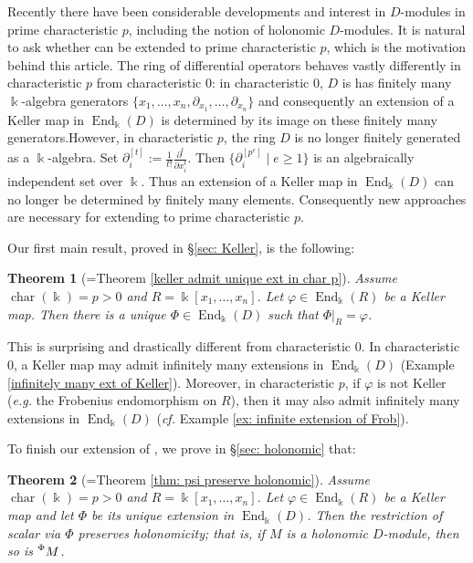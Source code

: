 \documentclass[11pt]{amsart}
\newtheorem{theorem}{Theorem}[section]
\theoremstyle{definition}
\theoremstyle{remark}
\numberwithin{equation}{subsection}
\DeclareMathOperator{\kk}{\Bbbk}
\DeclareMathOperator{\ch}{char}
\DeclareMathOperator{\End}{End}
\begin{document}
Recently there have been considerable developments and interest in $D$-modules in prime characteristic $p$, including the notion of holonomic $D$-modules. It is natural to ask whether \cite[Theorem 1.3]{BavulaAnnals} can be extended to prime characteristic $p$, which is the motivation behind this article. The ring of differential operators behaves vastly differently in characteristic $p$ from characteristic 0: in characteristic 0, $D$ is has finitely many $\kk$-algebra generators $\{x_1,\dots,x_n,\partial_{x_1},\dots,\partial_{x_n}\}$ and consequently an extension of a Keller map in $\End_{\kk}(D)$ is determined by its image on these finitely many generators.However, in characteristic $p$, the ring $D$ is no longer finitely generated as a $\kk$-algebra. Set $\partial_i^{[t]}:=\frac{1}{t!}\frac{\partial^{t}}{\partial x^t_i}$. Then $\{\partial_i^{[p^e]}\mid e\geq 1\}$ is an algebraically independent set over $\kk$. Thus an extension of a Keller map in $\End_{\kk}(D)$ can no longer be determined by finitely many elements. Consequently new approaches are necessary for extending \cite[Theorem 1.3]{BavulaAnnals} to prime characteristic $p$.

Our first main result, proved in \S\ref{sec: Keller}, is the following:
\begin{theorem}[=Theorem \ref{keller admit unique ext in char p}]
\label{main thm 1}
Assume $\ch(\kk)=p>0$ and $R=\kk[x_1,\dots,x_n]$. Let $\varphi\in \End_{\kk}(R)$ be a Keller map. Then there is a unique $\Phi\in \End_{\kk}(D)$ such that $\Phi|_R=\varphi$.
\end{theorem}

This is surprising and drastically different from characteristic 0. In characteristic 0, a Keller map may admit infinitely many extensions in $\End_{\kk}(D)$ (Example \ref{infinitely many ext of Keller}). Moreover, in characteristic $p$, if $\varphi$ is not Keller ({\it e.g.} the Frobenius endomorphism on $R$), then it may also admit infinitely many extensions in $\End_{\kk}(D)$ ({\it cf.} Example \ref{ex: infinite extension of Frob}).

To finish our extension of \cite[Theorem 1.3]{BavulaAnnals}, we prove in \S\ref{sec: holonomic} that:
\begin{theorem}[=Theorem \ref{thm: psi preserve holonomic}]
\label{main thm 2}
Assume $\ch(\kk)=p>0$ and $R=\kk[x_1,\dots,x_n]$. Let $\varphi\in \End_{\kk}(R)$ be a Keller map and let $\Phi$ be its unique extension in $\End_{\kk}(D)$. Then the restriction of scalar via $\Phi$ preserves holonomicity; that is, if $M$ is a holonomic $D$-module, then so is $\prescript{\Phi}{}M$.
\end{theorem}
\end{document}
